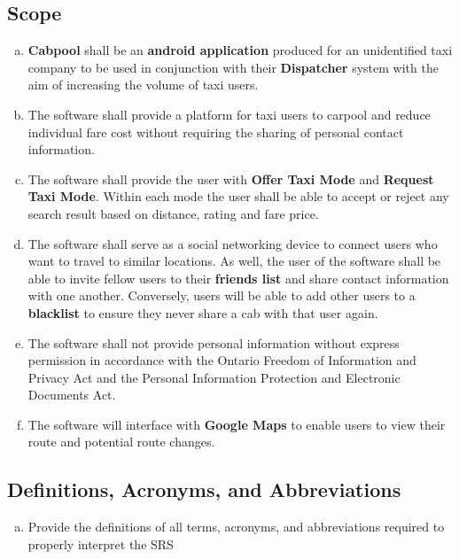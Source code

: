 \documentclass[english]{article}
\begin{document}
\subsection{Scope}
\label{sub:scope}
\begin{enumerate}[a)]
	\item \textbf{Cabpool} shall be an \textbf{android application} produced for an unidentified taxi company to be used in conjunction with their \textbf{Dispatcher} system with the aim of increasing the volume of taxi users.  
	\item The software shall provide a platform for taxi users to carpool and reduce individual fare cost without requiring the sharing of personal contact information.
	\item The software shall provide the user with \textbf{Offer Taxi Mode} and \textbf{Request Taxi Mode}. Within each mode the user shall be able to accept or reject any search result based on distance, rating and fare price.
	\item The software shall serve as a social networking device to connect users who want to travel to similar locations. As well, the user of the software shall be able to invite fellow users to their \textbf{friends list} and share contact information with one another. Conversely, users will be able to add other users to a \textbf{blacklist} to ensure they never share a cab with that user again. 
	\item The software shall not provide personal information without express permission in accordance with the Ontario Freedom of Information and Privacy Act and the Personal Information Protection and Electronic Documents Act. 
	\item The software will interface with \textbf{Google Maps} to enable users to view their route and potential route changes.
	\end{enumerate}

\subsection{Definitions, Acronyms, and Abbreviations}
\label{sub:definitions_acronyms_and_abbreviations}
\begin{enumerate}[a)]
	\item Provide the definitions of all terms, acronyms, and abbreviations required to properly interpret the SRS
\end{enumerate}
\end{document}
